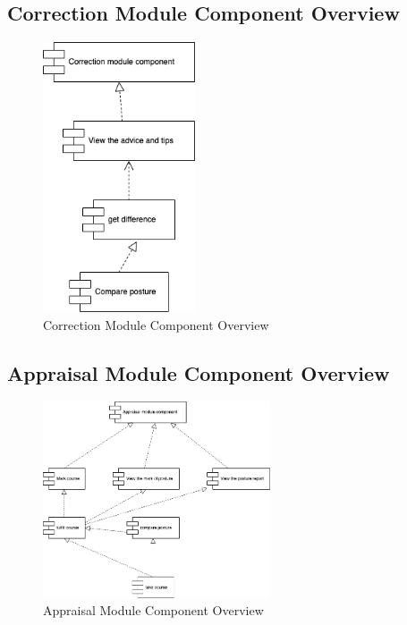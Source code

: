 \documentclass[16pt]{scrreprt}
\begin{document}
\subsection{Correction Module Component Overview}
\begin{figure}[H]
    \centering
    \includegraphics[width=0.4\textwidth]{diagrams/correction.png}
    \caption{Correction Module Component Overview}
\end{figure}

\subsection{Appraisal Module Component Overview}
\begin{figure}[H]
    \centering
    \includegraphics[width=0.6\textwidth]{diagrams/appraisal.png}
    \caption{Appraisal Module Component Overview}
\end{figure}
\end{document}
